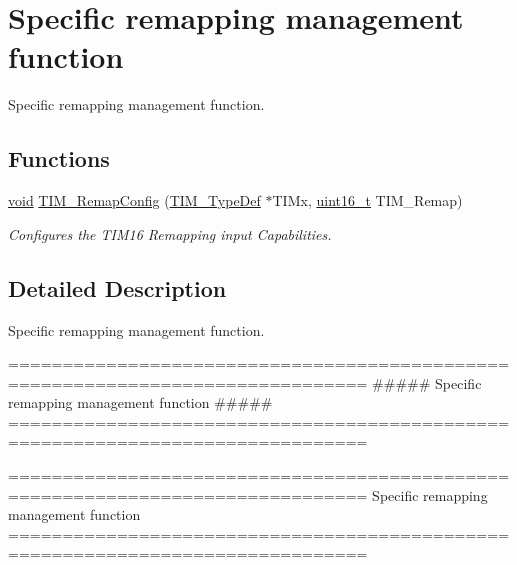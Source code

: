 \hypertarget{group___t_i_m___group9}{\section{Specific remapping management function}
\label{group___t_i_m___group9}
}


Specific remapping management function.  


\subsection*{Functions}
\begin{DoxyCompactItemize}
\item 
\hyperlink{group___n_a_m_e_ga18028b8badbf1ea7e704ccac3c488e82}{void} \hyperlink{group___t_i_m___group9_ga08ffb6f2bfa96b6fbcbb8d8001cb8ba9}{T\-I\-M\-\_\-\-Remap\-Config} (\hyperlink{struct_t_i_m___type_def}{T\-I\-M\-\_\-\-Type\-Def} $\ast$T\-I\-Mx, \hyperlink{stdint_8h_a273cf69d639a59973b6019625df33e30}{uint16\-\_\-t} T\-I\-M\-\_\-\-Remap)
\begin{DoxyCompactList}\small\item\em Configures the T\-I\-M16 Remapping input Capabilities. \end{DoxyCompactList}\end{DoxyCompactItemize}


\subsection{Detailed Description}
Specific remapping management function. \begin{DoxyVerb} ===============================================================================
               ##### Specific remapping management function #####
 ===============================================================================  \end{DoxyVerb}


\begin{DoxyVerb} ===============================================================================
                     Specific remapping management function
 ===============================================================================  \end{DoxyVerb}
 

